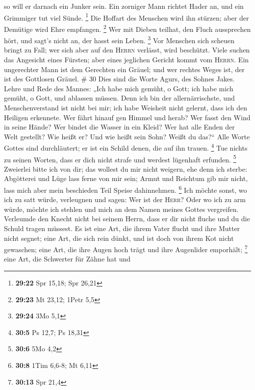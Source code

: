 so will er darnach ein Junker sein.  Ein zorniger Mann
richtet Hader an, und ein Grimmiger tut viel Sünde. \footnote{\textbf{29:22}
  Spr 15,18; Spr 26,21}  Die Hoffart des Menschen wird
ihn stürzen; aber der Demütige wird Ehre empfangen. \footnote{\textbf{29:23}
  Mt 23,12; 1Petr 5,5}  Wer mit Dieben teilhat, den Fluch
aussprechen hört, und sagt's nicht an, der hasst sein Leben. \footnote{\textbf{29:24}
  3Mo 5,1}  Vor Menschen sich scheuen bringt zu Fall; wer
sich aber auf den \textsc{Herrn} verlässt, wird beschützt.
 Viele suchen das Angesicht eines Fürsten; aber eines
jeglichen Gericht kommt vom \textsc{Herrn}.  Ein
ungerechter Mann ist dem Gerechten ein Gräuel; und wer rechtes Weges
ist, der ist des Gottlosen Gräuel. \# 30  Dies sind die
Worte Agurs, des Sohnes Jakes. Lehre und Rede des Mannes: „Ich habe mich
gemüht, o Gott; ich habe mich gemüht, o Gott, und ablassen müssen.
 Denn ich bin der allernärrischste, und Menschenverstand
ist nicht bei mir;  ich habe Weisheit nicht gelernt, dass
ich den Heiligen erkennete.  Wer fährt hinauf gen Himmel
und herab? Wer fasst den Wind in seine Hände? Wer bindet die Wasser in
ein Kleid? Wer hat alle Enden der Welt gestellt? Wie heißt er? Und wie
heißt sein Sohn? Weißt du das?{}``  Alle Worte Gottes sind
durchläutert; er ist ein Schild denen, die auf ihn trauen. \footnote{\textbf{30:5}
  Ps 12,7; Ps 18,31}  Tue nichts zu seinen Worten, dass er
dich nicht strafe und werdest lügenhaft erfunden. \footnote{\textbf{30:6}
  5Mo 4,2}  Zweierlei bitte ich von dir; das wollest du
mir nicht weigern, ehe denn ich sterbe:  Abgötterei und
Lüge lass ferne von mir sein; Armut und Reichtum gib mir nicht, lass
mich aber mein beschieden Teil Speise dahinnehmen. \footnote{\textbf{30:8}
  1Tim 6,6-8; Mt 6,11}  Ich möchte sonst, wo ich zu satt
würde, verleugnen und sagen: Wer ist der \textsc{Herr}? Oder wo ich zu
arm würde, möchte ich stehlen und mich an dem Namen meines Gottes
vergreifen.  Verleumde den Knecht nicht bei seinem Herrn,
dass er dir nicht fluche und du die Schuld tragen müssest.
 Es ist eine Art, die ihrem Vater flucht und ihre Mutter
nicht segnet;  eine Art, die sich rein dünkt, und ist
doch von ihrem Kot nicht gewaschen;  eine Art, die ihre
Augen hoch trägt und ihre Augenlider emporhält; \footnote{\textbf{30:13}
  Spr 21,4}  eine Art, die Schwerter für Zähne hat und
